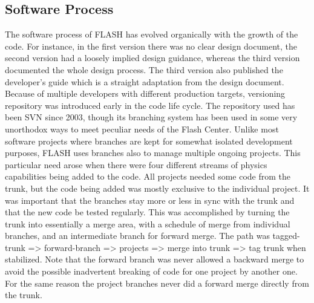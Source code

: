 \subsection{Software Process}
\label{sec:FLASHSoftwareProcess} 
The software process of FLASH has evolved organically with the growth
of the code. For instance, in the first version there was no clear
design document, the second version had a loosely implied design
guidance, whereas the third version documented the whole design
process. The third version also published the developer's guide which
is a straight adaptation from the design document. Because of multiple
developers with different production targets, versioning repository was
introduced early in the code life cycle. The repository used has been
SVN since 2003, though its branching system has been used in some very
unorthodox ways to meet peculiar needs of the Flash Center. Unlike
most software projects where branches are kept for somewhat isolated
development purposes, FLASH uses branches also to manage multiple
ongoing projects. This particular need arose when there were four
different streams of physics capabilities being added to the code. All
projects needed some code from the trunk, but the code being added was
mostly exclusive to the individual project. It was important that the
branches stay more or less in sync with the trunk and that the new
code be tested regularly. This was accomplished by turning the trunk
into essentially a merge area, with a schedule of merge from 
individual branches, and an intermediate branch for forward merge. The
path was tagged-trunk => forward-branch => projects => merge into
trunk => tag trunk when stabilized. Note that the forward branch was
never allowed a backward merge to avoid the possible inadvertent
breaking of code for one project by another one. For the same reason
the project branches never did a forward merge directly from the
trunk. 

